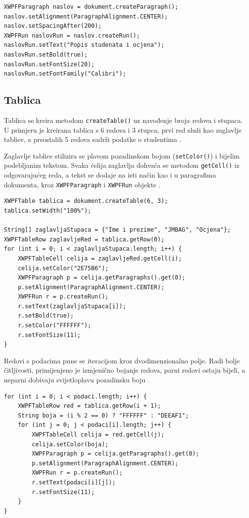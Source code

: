 \documentclass[]{foi}
\begin{document}
\begin{lstlisting}[style=Java, caption={Kreiranje naslova}]
XWPFParagraph naslov = dokument.createParagraph();
naslov.setAlignment(ParagraphAlignment.CENTER);
naslov.setSpacingAfter(200);
XWPFRun naslovRun = naslov.createRun();
naslovRun.setText("Popis studenata i ocjena");
naslovRun.setBold(true);
naslovRun.setFontSize(20);
naslovRun.setFontFamily("Calibri");
\end{lstlisting}

\subsection{Tablica}

Tablica se kreira metodom \texttt{createTable()} uz navođenje broja redova i stupaca. U primjeru je kreirana tablica s 6 redova i 3 stupca, prvi red služi kao zaglavlje tablice, a preostalih 5 redova sadrži podatke o studentima \cite{apacheXWPFQuickGuide}.

Zaglavlje tablice stilizira se plavom pozadinskom bojom (\texttt{setColor()}) i bijelim podebljanim tekstom. Svaka ćelija zaglavlja dohvaća se metodom \texttt{getCell()} iz odgovarajućeg reda, a tekst se dodaje na isti način kao i u paragrafima dokumenta, kroz \texttt{XWPFParagraph} i \texttt{XWPFRun} objekte \cite{apacheXWPFQuickGuide}.

\begin{lstlisting}[style=Java, caption=Kreiranje zaglavlja tablice]
XWPFTable tablica = dokument.createTable(6, 3);
tablica.setWidth("100%");

String[] zaglavljaStupaca = {"Ime i prezime", "JMBAG", "Ocjena"};
XWPFTableRow zaglavljeRed = tablica.getRow(0);
for (int i = 0; i < zaglavljaStupaca.length; i++) {
    XWPFTableCell celija = zaglavljeRed.getCell(i);
    celija.setColor("2E75B6");
    XWPFParagraph p = celija.getParagraphs().get(0);
    p.setAlignment(ParagraphAlignment.CENTER);
    XWPFRun r = p.createRun();
    r.setText(zaglavljaStupaca[i]);
    r.setBold(true);
    r.setColor("FFFFFF");
    r.setFontSize(11);
}
\end{lstlisting}

Redovi s podacima pune se iteracijom kroz dvodimenzionalno polje. Radi bolje čitljivosti, primijenjeno je izmjenično bojanje redova, parni redovi ostaju bijeli, a neparni dobivaju svijetloplavu pozadinsku boju \cite{apacheXWPFQuickGuide}.

\begin{lstlisting}[style=Java, caption=Punjenje tablice podacima]
for (int i = 0; i < podaci.length; i++) {
    XWPFTableRow red = tablica.getRow(i + 1);
    String boja = (i % 2 == 0) ? "FFFFFF" : "DEEAF1";
    for (int j = 0; j < podaci[i].length; j++) {
        XWPFTableCell celija = red.getCell(j);
        celija.setColor(boja);
        XWPFParagraph p = celija.getParagraphs().get(0);
        p.setAlignment(ParagraphAlignment.CENTER);
        XWPFRun r = p.createRun();
        r.setText(podaci[i][j]);
        r.setFontSize(11);
    }
}
\end{lstlisting}
\end{document}
